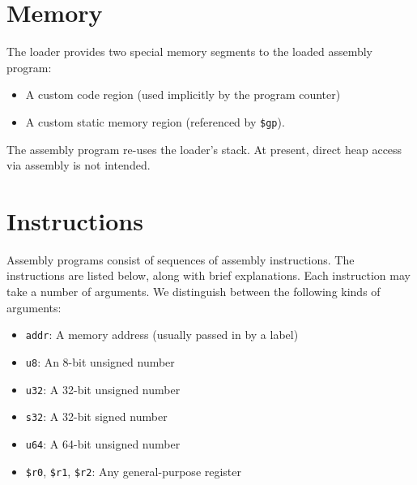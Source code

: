 \documentclass{article}
\begin{document}
\section{Memory}
The loader provides two special memory segments to the loaded assembly program:
\begin{itemize}
\item A custom code region (used implicitly by the program counter)
\item A custom static memory region (referenced by \texttt{\$gp}).
\end{itemize}
The assembly program re-uses the loader's stack.  At present, direct heap access via assembly is not intended.

\section{Instructions}

Assembly programs consist of sequences of assembly instructions.  The instructions are listed below, along with brief explanations.
Each instruction may take a number of arguments.  We distinguish between the following kinds of arguments:
\begin{itemize}
  \item \texttt{addr}: A memory address (usually passed in by a label)
  \item \texttt{u8}: An 8-bit unsigned number
  \item \texttt{u32}: A 32-bit unsigned number
  \item \texttt{s32}: A 32-bit signed number
  \item \texttt{u64}: A 64-bit unsigned number
  \item \texttt{\$r0}, \texttt{\$r1}, \texttt{\$r2}: Any general-purpose register
\end{itemize}
\end{document}
